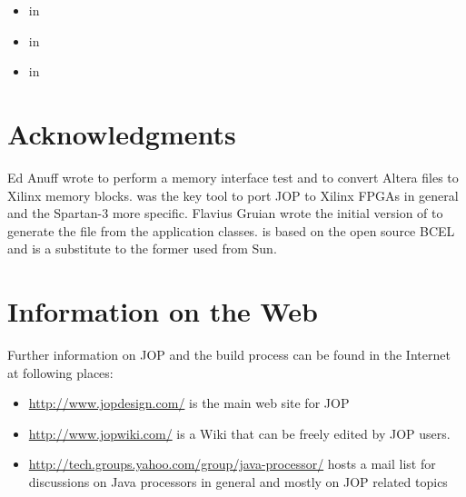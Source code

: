 \begin{itemize}
    \item {} in 
    \item {} in 
    \item {} in 
\end{itemize}

\section{Acknowledgments}

Ed Anuff wrote  to perform a memory interface test
and  to convert Altera  files to
Xilinx memory blocks.  was the key tool to port
JOP to Xilinx FPGAs in general and the Spartan-3 more specific.
Flavius Gruian wrote the initial version of  to
generate the  file from the application classes.
 is based on the open source BCEL and is a substitute
to the former used  from Sun.

\section{Information on the Web}

Further information on JOP and the build process can be found in the
Internet at following places:

\begin{itemize}
    \item \url{http://www.jopdesign.com/} is the main web site for
    JOP
    \item \url{http://www.jopwiki.com/} is a Wiki that can be freely
    edited by JOP users.
    \item \url{http://tech.groups.yahoo.com/group/java-processor/}
    hosts a mail list for discussions on Java processors in general
    and mostly on JOP related topics
\end{itemize}

%
%
